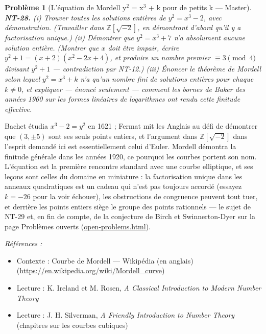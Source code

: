\documentclass[11pt]{article}
\newtheorem{problem}{Problème}
\newenvironment{refs}{\par\small\noindent\emph{Références :}\begin{itemize}\setlength\itemsep{0pt}}{\end{itemize}\normalsize}
\begin{document}
\begin{problem}[{L'équation de Mordell y$^2$ = x$^3$ + k pour de petits k --- Master}]
\textbf{NT-28.} (i) Trouver toutes les solutions entières de
$y^2 = x^3 - 2$, avec démonstration. (Travailler dans $\mathbb{Z}[\sqrt{-2}]$, en démontrant
d'abord qu'il y a factorisation unique.) (ii) Démontrer que $y^2 = x^3 + 7$ n'a absolument aucune
solution entière. (Montrer que $x$ doit être impair, écrire
$y^2 + 1 = (x + 2)(x^2 - 2x + 4)$, et produire un nombre premier $\equiv 3 \pmod 4$ divisant
$y^2 + 1$ --- contradiction par NT-12.) (iii) Énoncer le théorème de Mordell selon lequel
$y^2 = x^3 + k$ n'a qu'un nombre fini de solutions entières pour chaque $k \ne 0$, et
expliquer --- énoncé seulement --- comment les bornes de Baker des années 1960 sur les formes linéaires
de logarithmes ont rendu cette finitude effective.
\end{problem}

\noindent Bachet étudia $x^3 - 2 = y^2$ en 1621 ; Fermat mit les Anglais au défi de
démontrer que $(3, \pm 5)$ sont ses seuls points entiers, et l'argument dans
$\mathbb{Z}[\sqrt{-2}]$ dans l'esprit demandé ici est essentiellement celui d'Euler.
Mordell démontra la finitude générale dans les années 1920, ce pourquoi les courbes portent son
nom. L'équation est la première rencontre standard avec une courbe elliptique, et ses leçons sont
celles du domaine en miniature : la factorisation unique dans les anneaux quadratiques est un cadeau
qui n'est pas toujours accordé (essayez $k = -26$ pour la voir échouer), les obstructions de
congruence peuvent tout tuer, et derrière les points entiers siège le groupe des points rationnels ---
le sujet de NT-29 et, en fin de compte, de la conjecture de Birch et Swinnerton-Dyer sur la page
Problèmes ouverts (\url{open-problems.html}).

\begin{refs}
\item Contexte : Courbe de Mordell --- Wikipédia (en anglais) (\url{https://en.wikipedia.org/wiki/Mordell_curve})
\item Lecture : K. Ireland et M. Rosen, \textit{A Classical Introduction to Modern Number Theory}
\item Lecture : J. H. Silverman, \textit{A Friendly Introduction to Number Theory} (chapitres sur les courbes cubiques)
\end{refs}

\bigskip
\end{document}
